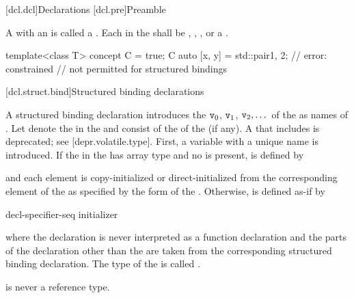\documentclass{wg21}
\begin{document}
[dcl.dcl]{Declarations}%
[dcl.pre]{Preamble}


\pnum
A  with an  is called
a .
Each  in the 
shall be
,
,
 , or
a .
\begin{example}
    \begin{codeblock}
        template<class T> concept C = true;
        C auto [x, y] = std::pair{1, 2};    // error: constrained 
        // not permitted for structured bindings
    \end{codeblock}
\end{example}

[dcl.struct.bind]{Structured binding declarations}%

\pnum
A structured binding declaration introduces the 
$\texttt{v}_0$, $\texttt{v}_1$, $\texttt{v}_2, \dotsc$
of the
 as names
of .
Let \cv{} denote the  in
the  and
 consist of the  of
the  (if any).
A \cv{} that includes  is deprecated;
see [depr.volatile.type].
First, a variable with a unique name  is introduced. If the
 in the 
has array type   and no  is present,
 is defined by
\begin{ncbnf}
      \cv{}   \terminal{;}
\end{ncbnf}
and each element is copy-initialized or direct-initialized
from the corresponding element of the  as specified
by the form of the .
Otherwise, 
is defined as-if by
\begin{ncbnf}
     decl-specifier-seq   initializer \terminal{;}
\end{ncbnf}
where
the declaration is never interpreted as a function declaration and
the parts of the declaration other than the  are taken
from the corresponding structured binding declaration.
The type of the 
 is called .
\begin{note}
     is never a reference type.
\end{note}
\end{document}
